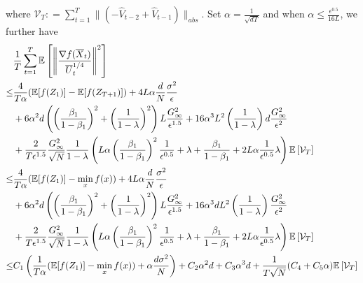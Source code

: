 \documentclass[anon,12pt]{colt2021} %
\begin{document}
where $ \mathcal{V}_T : = \sum_{t=1}^{T}   \|    (- \hat V_{t-2} + \hat V_{t-1} ) \|_{abs}$.
Set $\alpha = \frac{1}{\sqrt{dT}}$ and when $\alpha  \leq \frac{\epsilon^{0.5}}{16L} $, we further have
\begin{align}\notag
& \frac{1}{T}\sum_{t=1}^T  \mathbb E \left [\left\|\frac{\nabla f( \overline X_{t})}{\overline U_{t}^{1/4}}\right\|^2  \right] \nonumber \\
\leq & \frac{4}{T\alpha} ( \mathbb E  [f( Z_{1})]  -  \mathbb E [f( Z_{T+1})]) +  {4L}\alpha  \frac{d}{N}
\frac{ \sigma^2 }{\epsilon}  \nonumber \\
&+  6\alpha^2 d \left(\left( \frac{\beta_1}{1-\beta_1}\right)^2 + \left (\frac{1}{1-\lambda} \right)^2 \right)L  \frac{G_{\infty}^2 }{\epsilon^{1.5}} +  {16}\alpha^3 L^2     \left( \frac{1}{1-\lambda}\right)d \frac{G_{\infty}^2}{\epsilon^2} \nonumber \\
& +   \frac{2}{T \epsilon^{1.5}}  \frac{G_{\infty}^2}{\sqrt{N}} \frac{1}{1-\lambda}  \left( L  \alpha \left ( \frac{\beta_1}{1-\beta_1} \right)^2     \frac{1}{{\epsilon^{0.5}}}  +   \lambda + \frac{\beta_1}{1-\beta_1} + 2L\alpha \frac{1}{\epsilon^{0.5}}\lambda   \right)   \mathbb E \left[ \mathcal{V}_T \right] \nonumber \\
\leq & \frac{4}{T\alpha} ( \mathbb E  [f( Z_{1})]  -  \min_x  f(x)) +  {4L}\alpha  \frac{d}{N}
\frac{ \sigma^2 }{\epsilon}  \nonumber \\
&+  6\alpha^2 d \left(\left( \frac{\beta_1}{1-\beta_1}\right)^2 + \left (\frac{1}{1-\lambda} \right)^2 \right)L  \frac{G_{\infty}^2 }{\epsilon^{1.5}} +  {16}\alpha^3d L^2     \left( \frac{1}{1-\lambda}\right) \frac{G_{\infty}^2}{\epsilon^2} \nonumber \\
& +   \frac{2}{T \epsilon^{1.5}}  \frac{G_{\infty}^2}{\sqrt{N}} \frac{1}{1-\lambda}  \left( L  \alpha \left ( \frac{\beta_1}{1-\beta_1} \right)^2     \frac{1}{{\epsilon^{0.5}}}  +   \lambda + \frac{\beta_1}{1-\beta_1} + 2L\alpha \frac{1}{\epsilon^{0.5}}\lambda   \right)   \mathbb E \left[ \mathcal{V}_T \right] \nonumber \\
\leq & C_1\left(\frac{1}{T\alpha} ( \mathbb E  [f( Z_{1})]  -  \min_x  f(x)) +  \alpha  \frac{d\sigma^2}{N}\right)
+  C_2 \alpha^2 d  +  C_3 \alpha^3d + \frac{1}{T\sqrt{N}} (C_4 +  C_5 \alpha) \mathbb E \left[ \mathcal{V}_T \right]   \nonumber \\

\end{align}
\end{document}
